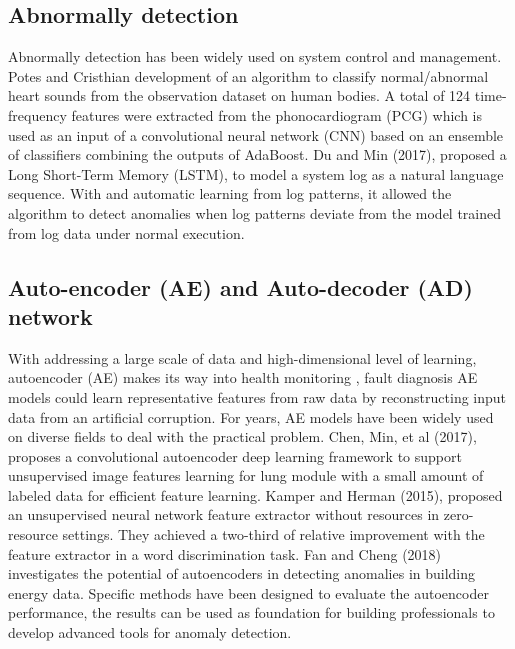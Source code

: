 \documentclass{article}
\begin{document}
\subsection{Abnormally detection}
Abnormally detection has been widely used on system control and management. Potes and Cristhian development of an algorithm to classify normal/abnormal heart sounds from the observation dataset on human bodies. A total of 124 time-frequency features were extracted from the phonocardiogram (PCG) which is used as an input of a convolutional neural network (CNN) based on an ensemble of classifiers combining the outputs of AdaBoost. \cite{AuthorPotes} Du and Min (2017), proposed a Long Short-Term
Memory (LSTM), to model a system log as a natural language sequence. With and automatic learning from log patterns, it allowed the algorithm to detect anomalies when log patterns deviate from the model trained from log data under normal execution. \cite{AuthorDu}

\subsection{Auto-encoder (AE) and Auto-decoder (AD) network}
With addressing a large scale of data and high-dimensional level of learning, autoencoder (AE) makes its way into health monitoring \cite{AuthorRZ}, fault diagnosis AE models could learn representative features from raw data by reconstructing input data from an artificial corruption. For years, AE models have been widely used on diverse fields to deal with the practical problem. Chen, Min, et al (2017), proposes a convolutional autoencoder deep learning framework to support unsupervised image
features learning for lung module with a small amount of labeled data for efficient feature learning. Kamper and Herman (2015), proposed an unsupervised neural network feature extractor without resources in zero-resource settings. They achieved a two-third of relative improvement with the feature extractor in a word discrimination task. \cite{AuthorKa} Fan and Cheng (2018) investigates the potential of autoencoders in detecting anomalies in building energy data. Specific methods have been
designed to evaluate the autoencoder performance, the results can be used as foundation for building professionals to develop advanced tools for anomaly detection. 
\end{document}
